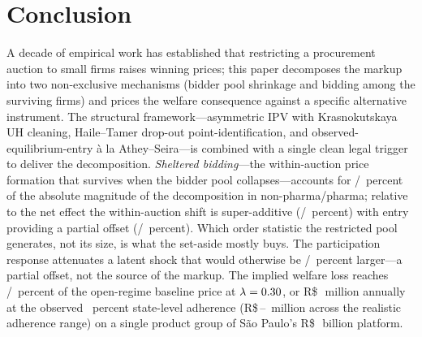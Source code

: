 \section{Conclusion}\label{sec:conclusion}

A decade of empirical work has established that restricting a procurement auction to small firms raises winning prices; this paper decomposes the markup into two non-exclusive mechanisms (bidder pool shrinkage and bidding among the surviving firms) and prices the welfare consequence against a specific alternative instrument. The structural framework---asymmetric IPV with Krasnokutskaya UH cleaning, Haile--Tamer drop-out point-identification, and observed-equilibrium-entry \`a la Athey--Seira---is combined with a single clean legal trigger to deliver the decomposition. \emph{Sheltered bidding}---the within-auction price formation that survives when the bidder pool collapses---accounts for \bneShareIntensNp/\bneShareIntensPh~percent of the absolute magnitude of the decomposition in non-pharma/pharma; relative to the net effect the within-auction shift is super-additive (\bneIntensRelNetNp/\bneIntensRelNetPh~percent) with entry providing a partial offset (\bneEntryRelNetNp/\bneEntryRelNetPh~percent). Which order statistic the restricted pool generates, not its size, is what the set-aside mostly buys. The participation response attenuates a latent shock that would otherwise be \latentShockRatioNp/\latentShockRatioPh~percent larger---a partial offset, not the source of the markup. The implied welfare loss reaches \welfLossPctLthirtyNp/\welfLossPctLthirtyPh~percent of the open-regime baseline price at $\lambda = 0.30$, or R\$\,\welfAnnualBRLLo~million annually at the observed \adherenceGsixtyfivePost~percent state-level adherence (R\$\,\welfRangeLoBRL--\welfRangeHiBRL~million across the realistic adherence range) on a single product group of S\~ao Paulo's R\$\,\becAnnualVolBRL~billion platform.

